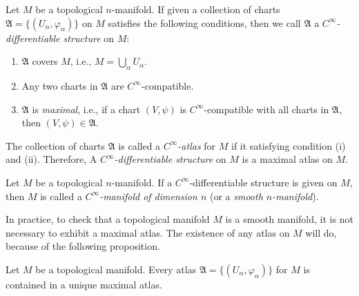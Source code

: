 \begin{definition}
    Let $M$ be a topological $n$-manifold. If given a collection of charts $\mathfrak{A} = \{(U_\alpha, \varphi_\alpha)\}$ on $M$ satisfies the following conditions, then we call $\mathfrak{A}$ a \emph{$C^\infty$-differentiable structure} on $M$:
    \begin{enumerate}
        \item $\mathfrak{A}$ covers $M$, i.e., $M = \bigcup_\alpha U_\alpha$.
        \item Any two charts in $\mathfrak{A}$ are $C^\infty$-compatible.
        \item $\mathfrak{A}$ is \emph{maximal}, i.e., if a chart $(V, \psi)$ is $C^\infty$-compatible with all charts in $\mathfrak{A}$, then $(V, \psi) \in \mathfrak{A}$.
    \end{enumerate}

    The collection of charts $\mathfrak{A}$ is called a \emph{$C^\infty$-atlas} for $M$ if it satisfying condition (i) and (ii). Therefore, A \emph{$C^\infty$-differentiable structure} on $M$ is a maximal atlas on $M$.
\end{definition}

\begin{definition}
    Let $M$ be a topological $n$-manifold. If a $C^\infty$-differentiable structure is given on $M$, then $M$ is called a \emph{$C^\infty$-manifold of dimension $n$} (or a \emph{smooth $n$-manifold}).
\end{definition}

In practice, to check that a topological manifold $M$ is a smooth manifold, it is not necessary to exhibit a maximal atlas. The existence of any atlas on $M$ will do, because of the following proposition.

\begin{proposition}\label{lem:condition of smooth manifold}
    Let $M$ be a topological manifold. Every atlas $\mathfrak{A} = \{(U_\alpha, \varphi_\alpha)\}$ for $M$ is contained in a unique maximal atlas.
\end{proposition}

